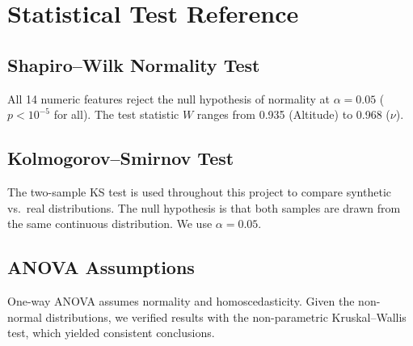 \documentclass[11pt, a4paper]{report}
\begin{document}
\appendix
\chapter{Statistical Test Reference}

\section{Shapiro--Wilk Normality Test}
All 14 numeric features reject the null hypothesis of normality at $\alpha = 0.05$ ($p < 10^{-5}$ for all). The test statistic $W$ ranges from 0.935 (Altitude) to 0.968 ($\nu$).

\section{Kolmogorov--Smirnov Test}
The two-sample KS test is used throughout this project to compare synthetic vs.\ real distributions. The null hypothesis is that both samples are drawn from the same continuous distribution. We use $\alpha = 0.05$.

\section{ANOVA Assumptions}
One-way ANOVA assumes normality and homoscedasticity. Given the non-normal distributions, we verified results with the non-parametric Kruskal--Wallis test, which yielded consistent conclusions.
\end{document}

